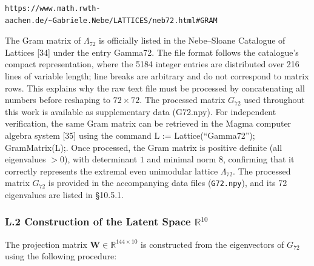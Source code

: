 \documentclass[11pt]{article}
\begin{document}
\begin{verbatim}
https://www.math.rwth-aachen.de/~Gabriele.Nebe/LATTICES/neb72.html#GRAM
\end{verbatim}

The Gram matrix of \(\Lambda_{72}\) is officially listed in the
Nebe--Sloane Catalogue of Lattices {[}34{]} under the entry Gamma72. The
file format follows the catalogue's compact representation, where the
5184 integer entries are distributed over 216 lines of variable length;
line breaks are arbitrary and do not correspond to matrix rows. This
explains why the raw text file must be processed by concatenating all
numbers before reshaping to \(72 \times 72\). The processed matrix
\(G_{72}\) used throughout this work is available as supplementary data
(G72.npy). For independent verification, the same Gram matrix can be
retrieved in the Magma computer algebra system {[}35{]} using the
command L := Lattice(``Gamma72''); GramMatrix(L);. Once processed, the
Gram matrix is positive definite (all eigenvalues \(>0\)), with
determinant \(1\) and minimal norm \(8\), confirming that it correctly
represents the extremal even unimodular lattice \(\Lambda_{72}\). The
processed matrix \(G_{72}\) is provided in the accompanying data files
(\texttt{G72.npy}), and its 72 eigenvalues are listed in §10.5.1.

\hypertarget{l.2-construction-of-the-latent-space-mathbbr10}{%
\subsubsection{\texorpdfstring{L.2 Construction of the Latent Space
\(\mathbb{R}^{10}\)}{L.2 Construction of the Latent Space \textbackslash mathbb\{R\}\^{}\{10\}}}\label{l.2-construction-of-the-latent-space-mathbbr10}}

The projection matrix \(\mathbf{W} \in \mathbb{R}^{144 \times 10}\) is
constructed from the eigenvectors of \(G_{72}\) using the following
procedure:
\end{document}
